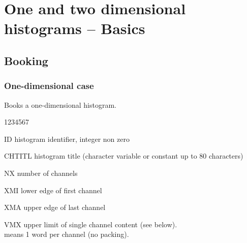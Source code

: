  
\chapter{One and two dimensional histograms -- Basics}
\label{HFUNDAMS}

\section{Booking}
\label{HBOOKING}
\subsection{One-dimensional case}


\Action Books a one-dimensional histogram.

\Idesc
\begin{DLttc}{1234567}
\item[ID] histogram identifier, integer non zero
\item[CHTITL] histogram title (character variable or constant up to 80
              characters)
\item[NX] number of channels
\item[XMI] lower edge of first channel
\item[XMA] upper edge of last channel
\item[VMX] upper limit of single channel content (see below).\\
            means 1 word per channel (no packing).
\end{DLttc}                                 

